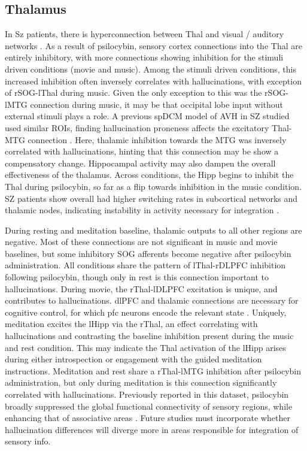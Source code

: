 \documentclass{article}
\begin{document}
\subsection{Thalamus}

In Sz patients, there is hyperconnection between Thal and visual / auditory networks \citep{damaraju_dynamic_2014}. As a result of psilocybin, sensory cortex connections into the Thal are entirely inhibitory, with more connections showing inhibition for the stimuli driven conditions (movie and music). Among the stimuli driven conditions, this increased inhibition often inversely correlates with hallucinations, with exception of rSOG-lThal during music. Given the only exception to this was the rSOG-lMTG connection during music, it may be that occipital lobe input without external stimuli plays a role. A previous spDCM model of AVH in SZ studied used similar ROIs, finding hallucination proneness affects the excitatory Thal-MTG connection \citep{li_abnormal_2017}. Here, thalamic inhibition towards the MTG was inversely correlated with hallucinations, hinting that this connection may be show a compensatory change. Hippocampal activity may also dampen the overall effectiveness of the thalamus. Across conditions, the Hipp begins to inhibit the Thal during psilocybin, so far as a flip towards inhibition in the music condition. SZ patients show overall had higher switching rates in subcortical networks and thalamic nodes, indicating instability in activity necessary for integration \citep{li_multilayer_2025}. 

During resting and meditation baseline, thalamic outputs to all other regions are negative. Most of these connections are not significant in music and movie baselines, but some inhibitory SOG afferents become negative after psilocybin administration. All conditions share the pattern of lThal-rDLPFC inhibition following psilocybin, though only in rest is this connection important to hallucinations. During movie, the rThal-lDLPFC excitation is unique, and contributes to hallucinations. dlPFC and thalamic connections are necessary for cognitive control, for which pfc neurons encode the relevant state \citep{denicola_differential_2020}. Uniquely, meditation excites the lHipp via the rThal, an effect correlating with hallucinations and contrasting the baseline inhibition present during the music and rest condition. This may indicate the Thal activation of the lHipp arises during either introspection or engagement with the guided meditation instructions. Meditation and rest share a rThal-lMTG inhibition after psilocybin administration, but only during meditation is this connection significantly correlated with hallucinations.  Previously reported in this dataset, psilocybin broadly suppressed the global functional connectivity of sensory regions, while enhancing that of associative areas \citep{stoliker_psychedelics_2025}. Future studies must incorporate whether hallucination differences will diverge more in areas responsible for integration of sensory info. 
\end{document}

